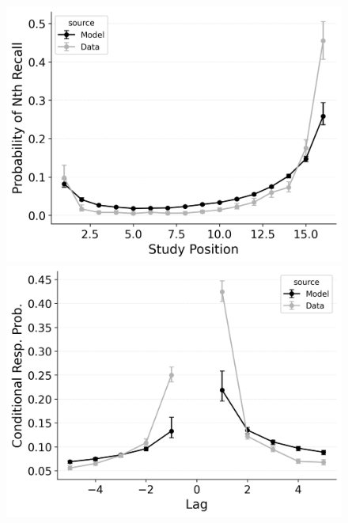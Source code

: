 \documentclass[
  man,
  floatsintext,
  longtable,
  nolmodern,
  notxfonts,
  notimes,
  draftfirst,
  colorlinks=true,linkcolor=blue,citecolor=blue,urlcolor=blue]{apa7}
\begin{document}
\begin{figure}
\begin{minipage}{0.33\linewidth}
\includegraphics{figures/bw_HealeyKahana2014_CRU_with_Primacy_and_StartDrift_Fitting_pnr.png}\end{minipage}%
%
\begin{minipage}{0.33\linewidth}
\includegraphics{figures/bw_HealeyKahana2014_CRU_with_Primacy_and_StartDrift_Fitting_crp.png}\end{minipage}%
%
\begin{minipage}{0.33\linewidth}

\end{minipage}
\end{figure}
\end{document}
